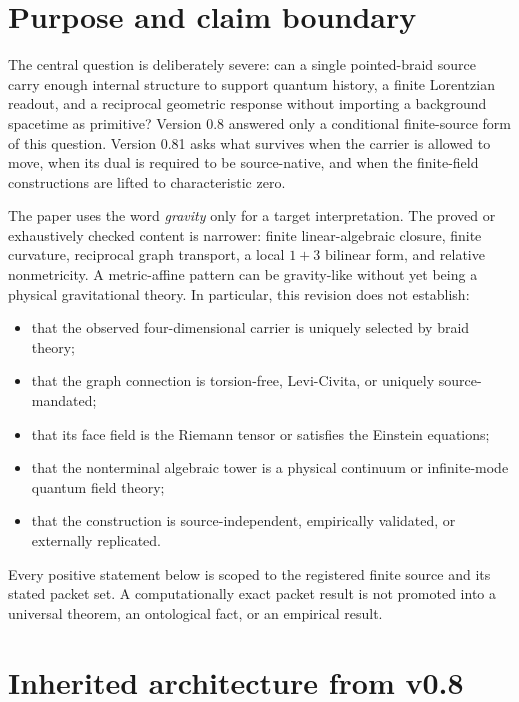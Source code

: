 \documentclass[12pt,a4paper,twoside]{article}
\begin{document}
\section{Purpose and claim boundary}

The central question is deliberately severe: can a single pointed-braid source carry enough internal structure to support quantum history, a finite Lorentzian readout, and a reciprocal geometric response without importing a background spacetime as primitive? Version 0.8 answered only a conditional finite-source form of this question. Version 0.81 asks what survives when the carrier is allowed to move, when its dual is required to be source-native, and when the finite-field constructions are lifted to characteristic zero.

The paper uses the word \emph{gravity} only for a target interpretation. The proved or exhaustively checked content is narrower: finite linear-algebraic closure, finite curvature, reciprocal graph transport, a local $1+3$ bilinear form, and relative nonmetricity. A metric-affine pattern can be gravity-like without yet being a physical gravitational theory. In particular, this revision does not establish:
\begin{itemize}
  \item that the observed four-dimensional carrier is uniquely selected by braid theory;
  \item that the graph connection is torsion-free, Levi-Civita, or uniquely source-mandated;
  \item that its face field is the Riemann tensor or satisfies the Einstein equations;
  \item that the nonterminal algebraic tower is a physical continuum or infinite-mode quantum field theory;
  \item that the construction is source-independent, empirically validated, or externally replicated.
\end{itemize}

\begin{tcolorbox}[colback=pale,colframe=blue,title={Revision rule}]
Every positive statement below is scoped to the registered finite source and its stated packet set. A computationally exact packet result is not promoted into a universal theorem, an ontological fact, or an empirical result.
\end{tcolorbox}

\section{Inherited architecture from v0.8}
\end{document}
